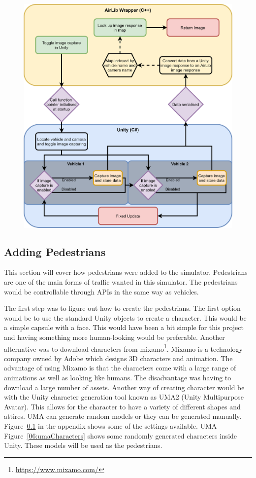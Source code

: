 \begin{figure}[h]
    \centering
    \includegraphics[width=1.0\textwidth]{06_Implementation/00_AirSim/Diagrams/imagecaptureUpdated.png}
    \caption{} \label{06:imageCaptureUpdated}
\end{figure}

\subsection{Adding Pedestrians}
This section will cover how pedestrians were added to the simulator. Pedestrians are one of the main forms of traffic wanted in this simulator. The pedestrians would be controllable through APIs in the same way as vehicles. 

The first step was to figure out how to create the pedestrians. The first option would be to use the standard Unity objects to create a character. This would be a simple capsule with a face. This would have been a bit simple for this project and having something more human-looking would be preferable. Another alternative was to download characters from mixamo\footnote{\url{ https://www.mixamo.com/}}. Mixamo is a technology company owned by Adobe which designs 3D characters and animation. The advantage of using Mixamo is that the characters come with a large range of animations as well as looking like humans. The disadvantage was having to download a large number of assets. Another way of creating character would be with the Unity character generation tool known as UMA2 (Unity Multipurpose Avatar). This allows for the character to have a variety of different shapes and attires. UMA can generate random models or they can be generated manually. Figure~\ref{} in the appendix shows some of the settings available. UMA  Figure~\ref{06:umaCharacters} shows some randomly generated characters inside Unity. These models will be used as the pedestrians. 

